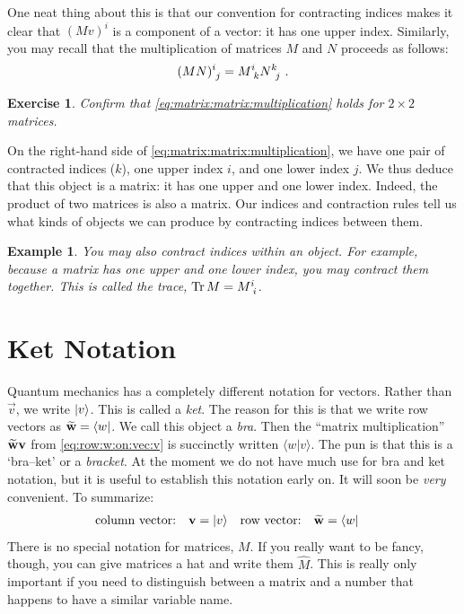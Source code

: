 \documentclass[12pt]{article}
\newtheorem{exercise}{Exercise}[section]
\newtheorem{example}{Example}[section]
\begin{document}
One neat thing about this is that our convention for contracting indices makes it clear that $(Mv)^i$ is a component of a vector: it has one upper index. Similarly, you may recall that the multiplication of matrices $M$ and $N$ proceeds as follows:
\begin{align}
 (MN)\aij{i}{j} = M\aij{i}{k}N\aij{k}{j} \ .
 \label{eq:matrix:matrix:multiplication}    
\end{align}
\begin{exercise}
Confirm that \eqref{eq:matrix:matrix:multiplication} holds for $2\times 2$ matrices.
\end{exercise}
On the right-hand side of \eqref{eq:matrix:matrix:multiplication}, we have one pair of contracted indices ($k$), one upper index $i$, and one lower index $j$. We thus deduce that this object is a matrix: it has one upper and one lower index. Indeed, the product of two matrices is also a matrix. Our indices and contraction rules tell us what kinds of objects we can produce by contracting indices between them. 

\begin{example}
You may also contract indices within an object. For example, because a matrix has one upper and one lower index, you may contract them together. This is called the trace, $\text{Tr}\,M = M\aij{i}{i}$.
\end{example}



\section{Ket Notation}

Quantum mechanics has a completely different notation for vectors. Rather than $\vec{v}$, we write $\left|v\right\rangle$. This is called a \emph{ket}. The reason for this is that we write row vectors as $\widetilde{\mathbf{w}} = \left\langle w\right|$. We call this object a \emph{bra}. Then the ``matrix multiplication'' $\widetilde{\mathbf{w}}\mathbf{v}$ from \eqref{eq:row:w:on:vec:v} is succinctly written $\langle w|v\rangle$. The pun is that this is a `bra--ket' or a \emph{bracket}. At the moment we do not have much use for bra and ket notation, but it is useful to establish this notation early on. It will soon be \emph{very} convenient. To summarize:
\begin{align}
    \textnormal{column vector:}\quad \mathbf{v} &= \left|v\right\rangle
    &
    \textnormal{row vector:}\quad \widetilde{\mathbf{w}} &= \left\langle w\right|
\end{align}
There is no special notation for matrices, $M$. If you really want to be fancy, though, you can give matrices a hat and write them $\hat M$. This is really only important if you need to distinguish between a matrix and a number that happens to have a similar variable name. 
\end{document}
